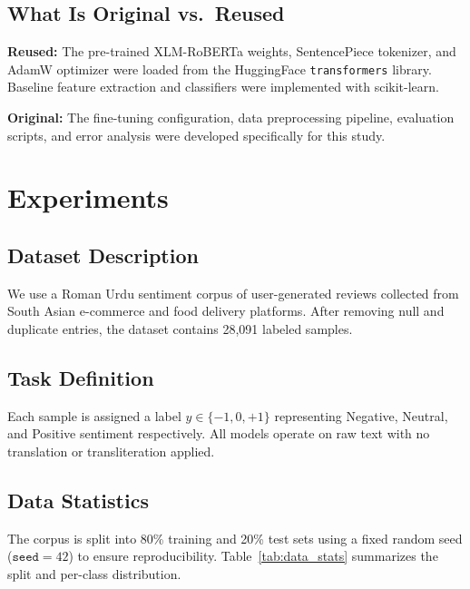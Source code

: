 \documentclass[conference]{IEEEtran}
\begin{document}
\subsection{What Is Original vs.\ Reused}
\textbf{Reused:} The pre-trained XLM-RoBERTa weights, SentencePiece tokenizer, and AdamW optimizer were loaded from the HuggingFace \texttt{transformers} library. Baseline feature extraction and classifiers were implemented with scikit-learn.

\textbf{Original:} The fine-tuning configuration, data preprocessing pipeline, evaluation scripts, and error analysis were developed specifically for this study.

\section{Experiments}

\subsection{Dataset Description}
We use a Roman Urdu sentiment corpus of user-generated reviews collected from South Asian e-commerce and food delivery platforms. After removing null and duplicate entries, the dataset contains 28,091 labeled samples.

\subsection{Task Definition}
Each sample is assigned a label $y \in \{-1, 0, +1\}$ representing Negative, Neutral, and Positive sentiment respectively. All models operate on raw text with no translation or transliteration applied.

\subsection{Data Statistics}
The corpus is split into 80\% training and 20\% test sets using a fixed random seed ($\texttt{seed} = 42$) to ensure reproducibility. Table~\ref{tab:data_stats} summarizes the split and per-class distribution.
\end{document}
